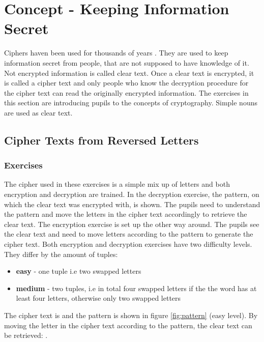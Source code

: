 \chapter{Concept - Keeping Information Secret}
\label{chapter:keepingInformationSecret}

Ciphers haven been used for thousands of years \cite{HistoryOfCryptography}. They are used to keep information secret from people, that are not supposed to have knowledge of it. Not encrypted information is called clear text. Once a clear text is encrypted, it is called a cipher text and only people who know the decryption procedure for the cipher text can read the originally encrypted information.
The exercises in this section are introducing pupils to the concepts of cryptography. Simple nouns are used as clear text.

\section{Cipher Texts from Reversed Letters}
\label{section:patterns}

\subsection{Exercises}
The cipher used in these exercises is a simple mix up of letters and both encryption and decryption are trained. In the decryption exercise, the pattern, on which the clear text was encrypted with, is shown. The pupils need to understand the pattern and move the letters in the cipher text accordingly to retrieve the clear text. The encryption exercise is set up the other way around. The pupils see the clear text and need to move letters according to the pattern to generate the cipher text. Both encryption and decryption exercises have two difficulty levels. They differ by the amount of tuples:

\begin{itemize}
    \item \textbf{easy} - one tuple i.e two swapped letters 
    \item \textbf{medium} - two tuples, i.e in total four swapped letters if the the word has at least four letters, otherwise only two swapped letters 
\end{itemize}

\begin{example}
    The cipher text is  and the pattern is shown in figure \ref{fig:pattern} (easy level). By moving the letter in the cipher text according to the pattern, the clear text can be retrieved: .
\end{example}

